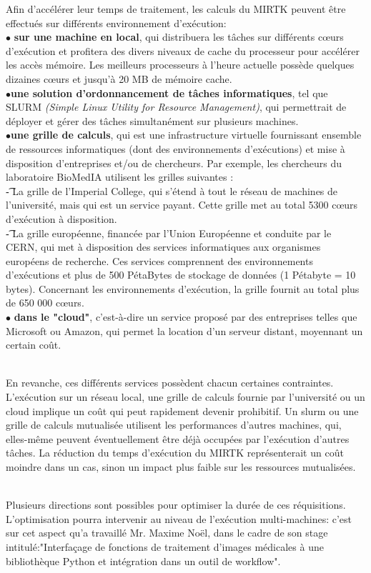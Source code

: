 \documentclass[10pt]{report}
\begin{document}
	Afin d'accélérer leur temps de traitement, les calculs du MIRTK peuvent être effectués sur différents environnement d'exécution:
	\\{$\bullet$}\textbf{ sur une machine en local}, 
	qui distribuera les tâches sur différents cœurs d'exécution et profitera des divers niveaux de cache du processeur pour accélérer les accès mémoire. Les meilleurs processeurs à l'heure actuelle possède quelques dizaines cœurs et jusqu'à 20 MB de mémoire cache.
	\\{$\bullet$}\textbf{une solution d'ordonnancement de tâches informatiques}, tel que SLURM \textit{(Simple Linux Utility for Resource Management)}, qui permettrait de déployer et gérer des tâches simultanément sur plusieurs machines. 
	\\{$\bullet$}\textbf{une grille de calculs}, qui est une infrastructure virtuelle fournissant ensemble de ressources informatiques (dont des environnements d'exécutions) et mise à disposition d'entreprises et/ou de chercheurs. \newline
	Par exemple, les chercheurs du laboratoire BioMedIA utilisent les grilles suivantes : \\
	\t - La grille de l'Imperial College, qui s'étend à tout le réseau de machines de l'université, mais qui est un service payant. Cette grille met au total 5300 cœurs d'exécution à disposition.\\
	\t - La grille européenne, financée par l'Union Européenne et conduite par le CERN, qui met à disposition des services informatiques aux organismes européens de recherche. Ces services comprennent des environnements d'exécutions et plus de 500 PétaBytes de stockage de données (1 Pétabyte = 10 bytes). Concernant les environnements d'exécution, la grille fournit au total plus de 650 000 cœurs.
	\\{$\bullet$}\textbf{ dans le "cloud"}, c'est-à-dire un service proposé par des entreprises telles que Microsoft ou Amazon, qui permet la location d'un serveur distant, moyennant un certain coût. \\ ~\par
	En revanche, ces différents services possèdent chacun certaines contraintes. L'exécution sur un réseau local, une grille de calculs fournie par l'université ou un cloud implique un coût qui peut rapidement devenir prohibitif. Un slurm ou une grille de calculs mutualisée utilisent les performances d'autres machines, qui, elles-même peuvent éventuellement être déjà occupées par l'exécution d'autres tâches. La réduction du temps d'exécution du MIRTK représenterait un coût moindre dans un cas, sinon un impact plus faible sur les ressources mutualisées.\\ ~\par
	Plusieurs directions sont possibles pour optimiser la durée de ces réquisitions. L'optimisation pourra intervenir au niveau de l'exécution multi-machines: c'est sur cet aspect qu'a travaillé Mr. Maxime Noël, dans le cadre de son stage intitulé:"Interfaçage de fonctions de traitement d'images médicales à une bibliothèque Python et intégration dans un outil de workflow".\\
	\vspace{-0.7cm}
\end{document}
